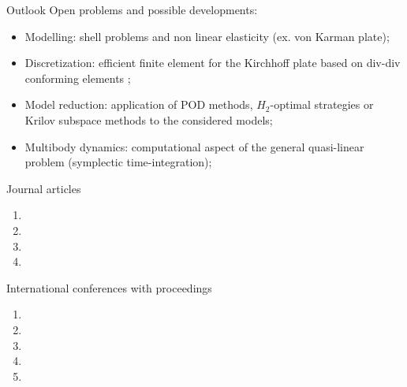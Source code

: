 \documentclass[aspectratio=169]{ISAE-Beamer}
\begin{document}
\begin{frame}{Outlook}
Open problems and possible developments:
\begin{itemize}
	\item Modelling: shell problems and non linear elasticity (ex. von Karman plate);
	\item Discretization: efficient finite element for the Kirchhoff plate based on div-div conforming elements ;
	\item Model reduction: application of POD methods, $H_2$-optimal strategies or Krilov subspace methods to the considered models;
	\item Multibody dynamics: computational aspect of the general quasi-linear problem (symplectic time-integration);
\end{itemize}
\end{frame}


\begin{frame}{Journal articles}
\begin{enumerate}
\item {} 
\vspace{.3cm}
\item {} 
\vspace{.3cm}
\item {} 
\vspace{.3cm}
\item {}
\end{enumerate}
\end{frame}

\begin{frame}{International conferences with proceedings}
\begin{enumerate}
\item {} 
\vspace{.1cm}
\item {} 
\vspace{.1cm}
\item {} 
\vspace{.1cm}
\item {} 
\vspace{.1cm}
\item {}
\end{enumerate}
\end{frame}

\appendix
\end{document}
